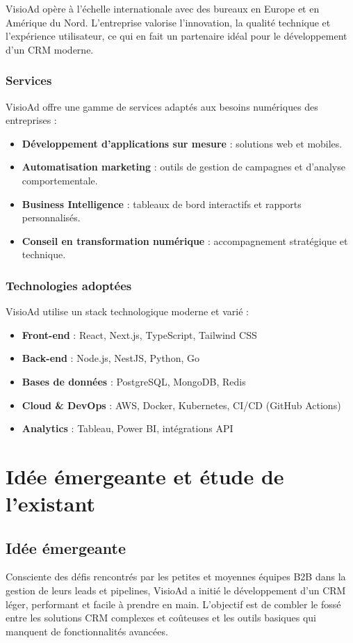 VisioAd opère à l'échelle internationale avec des bureaux en Europe et en Amérique du Nord. L'entreprise valorise l'innovation, la qualité technique et l'expérience utilisateur, ce qui en fait un partenaire idéal pour le développement d'un CRM moderne.

\subsubsection{Services}
VisioAd offre une gamme de services adaptés aux besoins numériques des entreprises :
\begin{itemize}
    \item \textbf{Développement d'applications sur mesure} : solutions web et mobiles.
    \item \textbf{Automatisation marketing} : outils de gestion de campagnes et d'analyse comportementale.
    \item \textbf{Business Intelligence} : tableaux de bord interactifs et rapports personnalisés.
    \item \textbf{Conseil en transformation numérique} : accompagnement stratégique et technique.
\end{itemize}

\subsubsection{Technologies adoptées}
VisioAd utilise un stack technologique moderne et varié :
\begin{itemize}
    \item \textbf{Front-end} : React, Next.js, TypeScript, Tailwind CSS
    \item \textbf{Back-end} : Node.js, NestJS, Python, Go
    \item \textbf{Bases de données} : PostgreSQL, MongoDB, Redis
    \item \textbf{Cloud \& DevOps} : AWS, Docker, Kubernetes, CI/CD (GitHub Actions)
    \item \textbf{Analytics} : Tableau, Power BI, intégrations API
\end{itemize}

\FloatBarrier
\section{Idée émergeante et étude de l'existant}

\subsection{Idée émergeante}
Consciente des défis rencontrés par les petites et moyennes équipes B2B dans la gestion de leurs leads et pipelines, VisioAd a initié le développement d'un CRM léger, performant et facile à prendre en main. L'objectif est de combler le fossé entre les solutions CRM complexes et coûteuses et les outils basiques qui manquent de fonctionnalités avancées.

